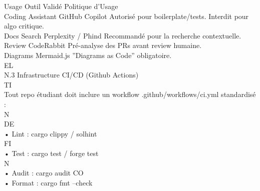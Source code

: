 \documentclass[12pt,landscape,a4paper]{article}
\begin{document}
\vspace{0.5em}
Usage            Outil Validé       Politique d’Usage\\
Coding Assistant GitHub Copilot     Autorisé pour boilerplate/tests. Interdit pour algo critique.\\
Docs Search      Perplexity / Phind Recommandé pour la recherche contextuelle.\\
Review           CodeRabbit         Pré-analyse des PRs avant review humaine.\\
Diagrams         Mermaid.js         ”Diagrams as Code” obligatoire.\\
\vspace{0.5em}
\vspace{0.5em}
\vspace{0.5em}
\vspace{0.5em}
EL\\
N.3 Infrastructure CI/CD (Github Actions)\\
\vspace{0.5em}
\vspace{0.5em}
\vspace{0.5em}
\vspace{0.5em}
TI\\
Tout repo étudiant doit inclure un workflow .github/workflows/ci.yml standardisé :\\
\vspace{0.5em}
\vspace{0.5em}
\vspace{0.5em}
\vspace{0.5em}
N\\
DE\\
• Lint : cargo clippy / solhint\\
\vspace{0.5em}
\vspace{0.5em}
\vspace{0.5em}
\vspace{0.5em}
FI\\
• Test : cargo test / forge test\\
\vspace{0.5em}
\vspace{0.5em}
\vspace{0.5em}
\vspace{0.5em}
N\\
• Audit : cargo audit                          CO\\
• Format : cargo fmt --check\\
\vspace{0.5em}
\vspace{0.5em}
\end{document}
